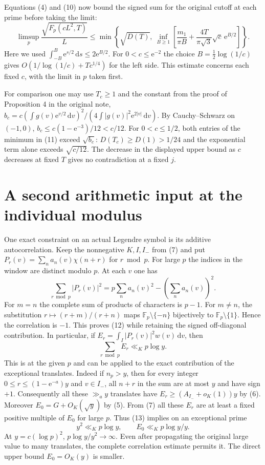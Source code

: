 \documentclass[11pt]{article}
\newcommand{\e}{\mathrm e}
\newcommand{\wt}{\mathrm d}
\begin{document}
Equations (4) and (10) now bound the signed sum for the original
cutoff at each prime before taking the limit:
\[
 \limsup_p\frac{\sqrt{F_p(cL^2,T)}}{L}\le
 \min\left\{\sqrt{D(T)},\
 \inf_{B\ge1}\left[\frac{m_1}{\pi B}
       +\frac{4T}{\pi\sqrt 3}\sqrt c\,\e^{B/2}\right]\right\}.
 \tag{11}
\]
Here we used $\int_{-B}^B\e^{s/2}\,\wt s\le2\e^{B/2}$.
For $0<c\le\e^{-2}$ the choice $B=\tfrac12\log(1/c)$ gives
$O(1/\log(1/c)+T c^{1/4})$ for the left side. This estimate concerns
each fixed $c$, with the limit in $p$ taken first.

For comparison one may use $T_c\ge1$ and the constant from the proof
of Proposition 4 in the original note,
$b_c=c(\int g(v)\e^{v/2}\,\wt v)^2/(4\int |g(v)|^2\e^{2|v|}\,\wt v)$.
By Cauchy--Schwarz on $(-1,0)$, $b_c\le c(1-\e^{-3})/12<c/12$.
For $0<c\le1/2$, both entries of the minimum in (11) exceed
$\sqrt{b_c}$: $D(T_c)\ge D(1)>1/24$ and the exponential term alone
exceeds $\sqrt{c/12}$. The decrease in the displayed upper bound
as $c$ decreases at fixed $T$ gives no contradiction at a fixed $j$.

\section{A second arithmetic input at the individual modulus}
One exact constraint on an actual Legendre symbol is its additive
autocorrelation. Keep the nonnegative $K,I,I_-$ from (7) and put
$P_r(v)=\sum_n a_n(v)\chi(n+r)$ for $r\bmod p$. For large $p$ the
indices in the window are distinct modulo $p$. At each $v$ one has
\[
 \sum_{r\bmod p}|P_r(v)|^2
 =p\sum_n a_n(v)^2-\left(\sum_n a_n(v)\right)^2 .
 \tag{12}
\]
For $m=n$ the complete sum of products of characters is $p-1$.
For $m\ne n$, the substitution $r\mapsto(r+m)/(r+n)$ maps
$\mathbb F_p\setminus\{-n\}$ bijectively to
$\mathbb F_p\setminus\{1\}$. Hence the correlation is $-1$. This
proves (12) while retaining the signed off-diagonal contribution.
In particular, if $E_r=\int_I |P_r(v)|^2 w(v)\,\wt v$, then
\[
 \sum_{r\bmod p} E_r\ll_K p\log y.
 \tag{13}
\]
This is at the given $p$ and can be applied to the exact contribution
of the exceptional translates. Indeed if $n_p>y$, then for every
integer $0\le r\le (1-\e^{-a})y$ and $v\in I_-$, all $n+r$ in
the sum are at most $y$ and have sign $+1$. Consequently all these
$\gg_a y$ translates have $E_r\ge (A_{I_-}+o_K(1))y$ by (6).
Moreover $E_0=G+O_K(\sqrt y)$ by (5). From (7) all these $E_r$
are at least a fixed positive multiple of $E_0$ for large $p$.
Thus (13) implies on an exceptional prime
\[
 y^2\ll_K p\log y,\qquad E_0\ll_K p\log y/y.
 \tag{14}
\]
At $y=c(\log p)^2$, $p\log y/y^2\to\infty$. Even after propagating
the original large value to many translates, the complete correlation
estimate permits it. The direct upper bound $E_0=O_K(y)$ is smaller.
\end{document}
